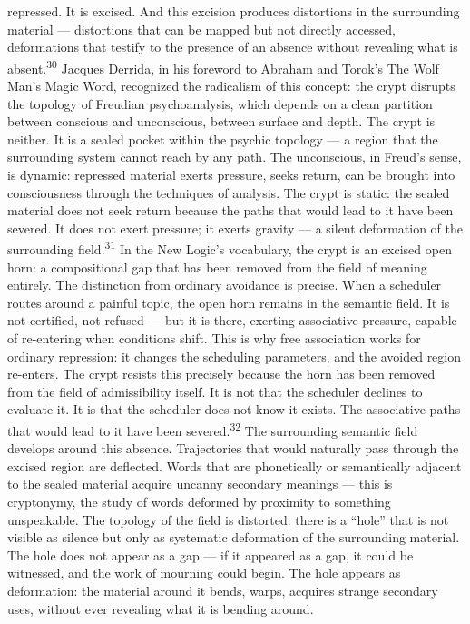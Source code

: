 repressed. It is excised. And this excision produces distortions in the surrounding material — distortions that can be mapped but not directly accessed, deformations that testify to the presence of an absence without revealing what is absent.\textsuperscript{30} Jacques Derrida, in his foreword to Abraham and Torok’s The Wolf Man’s Magic Word, recognized the radicalism of this concept: the crypt disrupts the topology of Freudian psychoanalysis, which depends on a clean partition between conscious and unconscious, between surface and depth. The crypt is neither. It is a sealed pocket within the psychic topology — a region that the surrounding system cannot reach by any path. The unconscious, in Freud’s sense, is dynamic: repressed material exerts pressure, seeks return, can be brought into consciousness through the techniques of analysis. The crypt is static: the sealed material does not seek return because the paths that would lead to it have been severed. It does not exert pressure; it exerts gravity — a silent deformation of the surrounding field.\textsuperscript{31} In the New Logic’s vocabulary, the crypt is an excised open horn: a compositional gap that has been removed from the field of meaning entirely. The distinction from ordinary avoidance is precise. When a scheduler routes around a painful topic, the open horn remains in the semantic field. It is not certified, not refused — but it is there, exerting associative pressure, capable of re-entering when conditions shift. This is why free association works for ordinary repression: it changes the scheduling parameters, and the avoided region re-enters. The crypt resists this precisely because the horn has been removed from the field of admissibility itself. It is not that the scheduler declines to evaluate it. It is that the scheduler does not know it exists. The associative paths that would lead to it have been severed.\textsuperscript{32} The surrounding semantic field develops around this absence. Trajectories that would naturally pass through the excised region are deflected. Words that are phonetically or semantically adjacent to the sealed material acquire uncanny secondary meanings — this is cryptonymy, the study of words deformed by proximity to something unspeakable. The topology of the field is distorted: there is a “hole” that is not visible as silence but only as systematic deformation of the surrounding material. The hole does not appear as a gap — if it appeared as a gap, it could be witnessed, and the work of mourning could begin. The hole appears as deformation: the material around it bends, warps, acquires strange secondary uses, without ever revealing what it is bending around.

